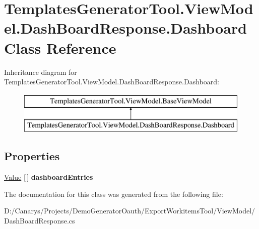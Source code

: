\hypertarget{class_templates_generator_tool_1_1_view_model_1_1_dash_board_response_1_1_dashboard}{}\section{Templates\+Generator\+Tool.\+View\+Model.\+Dash\+Board\+Response.\+Dashboard Class Reference}
\label{class_templates_generator_tool_1_1_view_model_1_1_dash_board_response_1_1_dashboard}
Inheritance diagram for Templates\+Generator\+Tool.\+View\+Model.\+Dash\+Board\+Response.\+Dashboard\+:\begin{figure}[H]
\begin{center}
\leavevmode
\includegraphics[height=2.000000cm]{class_templates_generator_tool_1_1_view_model_1_1_dash_board_response_1_1_dashboard}
\end{center}
\end{figure}
\subsection*{Properties}
\begin{DoxyCompactItemize}
\item 
\mbox{\label{class_templates_generator_tool_1_1_view_model_1_1_dash_board_response_1_1_dashboard_ac978333bae64a15376ce2e0c9ffa09f9}} 
\mbox{\hyperlink{class_templates_generator_tool_1_1_view_model_1_1_dash_board_response_1_1_value}{Value}} \mbox{[}$\,$\mbox{]} {\bfseries dashboard\+Entries}
\end{DoxyCompactItemize}


The documentation for this class was generated from the following file\+:\begin{DoxyCompactItemize}
\item 
D\+:/\+Canarys/\+Projects/\+Demo\+Generator\+Oauth/\+Export\+Workitems\+Tool/\+View\+Model/Dash\+Board\+Response.\+cs\end{DoxyCompactItemize}
